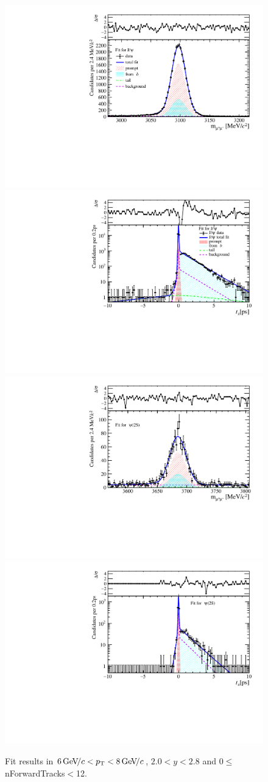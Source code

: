 \begin{figure}[H]
\begin{center}
\includegraphics[width=0.47\linewidth]{pdf/Jpsi/drawmassF/n1y1pt4.pdf}
\includegraphics[width=0.47\linewidth]{pdf/Jpsi/2DFitF/n1y1pt4.pdf}
\vspace*{-0.5cm}
\includegraphics[width=0.47\linewidth]{pdf/Psi2S/drawmassF/n1y1pt4.pdf}
\includegraphics[width=0.47\linewidth]{pdf/Psi2S/2DFitF/n1y1pt4.pdf}
\vspace*{-0.5cm}
\end{center}
\caption{Fit results in $6\text{\,Ge\kern -0.1em V\!/}c<p_{\mathrm{T}}<8\text{\,Ge\kern -0.1em V\!/}c$, $2.0<y<2.8$ and 0$\leq$nForwardTracks$<$12.}
\label{Fitn1y1pt4}
\end{figure}
